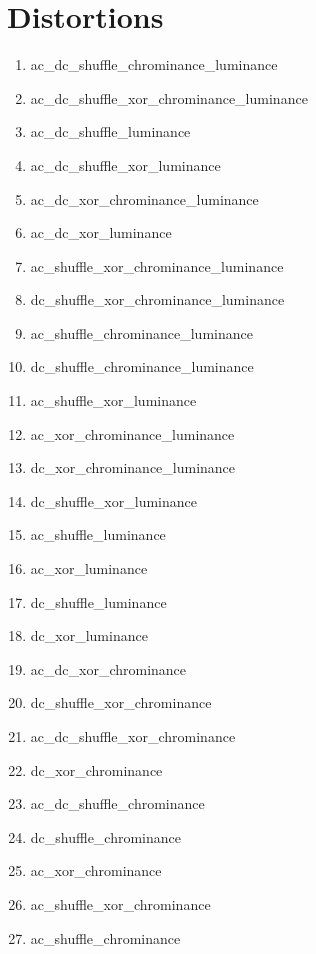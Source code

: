 \documentclass{article}
\begin{document}

\appendix
\section{Distortions}
\label{ann:distortions}
\begin{enumerate}
  \itemsep-0.5em 
  \setcounter{enumi}{-1}
\item ac\_dc\_shuffle\_chrominance\_luminance
\item ac\_dc\_shuffle\_xor\_chrominance\_luminance
\item ac\_dc\_shuffle\_luminance
\item ac\_dc\_shuffle\_xor\_luminance
\item ac\_dc\_xor\_chrominance\_luminance
\item ac\_dc\_xor\_luminance
\item ac\_shuffle\_xor\_chrominance\_luminance
\item dc\_shuffle\_xor\_chrominance\_luminance
\item ac\_shuffle\_chrominance\_luminance
\item dc\_shuffle\_chrominance\_luminance
\item ac\_shuffle\_xor\_luminance
\item ac\_xor\_chrominance\_luminance
\item dc\_xor\_chrominance\_luminance
\item dc\_shuffle\_xor\_luminance
\item ac\_shuffle\_luminance
\item ac\_xor\_luminance
\item dc\_shuffle\_luminance
\item dc\_xor\_luminance
\item ac\_dc\_xor\_chrominance
\item dc\_shuffle\_xor\_chrominance
\item ac\_dc\_shuffle\_xor\_chrominance
\item dc\_xor\_chrominance
\item ac\_dc\_shuffle\_chrominance
\item dc\_shuffle\_chrominance
\item ac\_xor\_chrominance
\item ac\_shuffle\_xor\_chrominance
\item ac\_shuffle\_chrominance
\end{enumerate}
\end{document}
